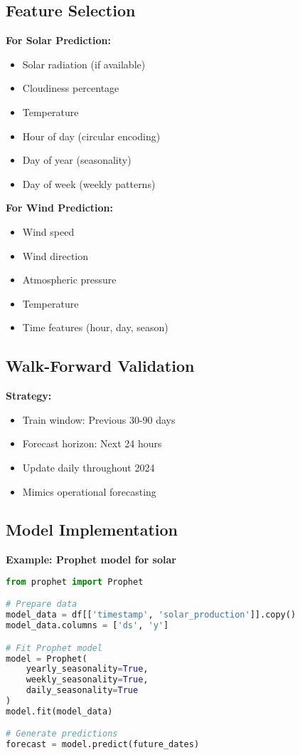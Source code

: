 \documentclass[11pt,a4paper]{article}
\begin{document}
\subsection{Feature Selection}

\textbf{For Solar Prediction:}
\begin{itemize}
    \item Solar radiation (if available)
    \item Cloudiness percentage
    \item Temperature
    \item Hour of day (circular encoding)
    \item Day of year (seasonality)
    \item Day of week (weekly patterns)
\end{itemize}

\textbf{For Wind Prediction:}
\begin{itemize}
    \item Wind speed
    \item Wind direction
    \item Atmospheric pressure
    \item Temperature
    \item Time features (hour, day, season)
\end{itemize}

\subsection{Walk-Forward Validation}

\textbf{Strategy:}
\begin{itemize}
    \item Train window: Previous 30-90 days
    \item Forecast horizon: Next 24 hours
    \item Update daily throughout 2024
    \item Mimics operational forecasting
\end{itemize}

\subsection{Model Implementation}

\begin{codebox}
\textbf{Example: Prophet model for solar}
\begin{lstlisting}[language=Python]
from prophet import Prophet

# Prepare data
model_data = df[['timestamp', 'solar_production']].copy()
model_data.columns = ['ds', 'y']

# Fit Prophet model
model = Prophet(
    yearly_seasonality=True,
    weekly_seasonality=True,
    daily_seasonality=True
)
model.fit(model_data)

# Generate predictions
forecast = model.predict(future_dates)
\end{lstlisting}
\end{codebox}
\end{document}
